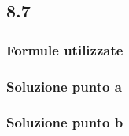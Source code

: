 \documentclass[../../main.tex]{subfiles}
\begin{document}
\subsection*{8.7}
\subsubsection*{Formule utilizzate}
\subsubsection*{Soluzione punto a}
\subsubsection*{Soluzione punto b}
\newpage
\end{document}
